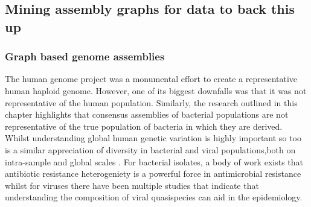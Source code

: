 \documentclass{article}
\begin{document}
\subsection{Mining assembly graphs for data to back this up}






\subsubsection{Graph based genome assemblies}
The human genome project was a monumental effort to create a representative human haploid genome. However, one of its biggest downfalls was that it was not representative of the human population. Similarly, the research outlined in this chapter highlights that consensus assemblies of bacterial populations are not representative of the true population of bacteria in which they are derived. Whilst understanding global human genetic variation is highly important so too is a similar appreciation of diversity in bacterial and viral populations,both on intra-sample and global scales . For bacterial isolates, a body of work exists that antibiotic resistance heterogeniety is a powerful force in antimicrobial resistance whilst for viruses there have been multiple  studies that indicate that understanding the composition of viral quasispecies can aid in the epidemiology. 
\end{document}
